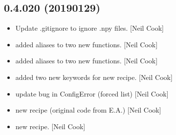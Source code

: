 \documentclass[a4paper,10pt,english]{report}
\begin{document}
\subsection{0.4.020 (2019\sphinxhyphen{}01\sphinxhyphen{}29)}
\label{\detokenize{misc/changelog:id222}}\begin{itemize}
\item {} 
Update .gitignore to ignore .npy files. {[}Neil Cook{]}

\item {} 
 \sphinxhyphen{} added aliases to two new  functions. {[}Neil
Cook{]}

\item {} 
 \sphinxhyphen{} added aliases to two new 
functions. {[}Neil Cook{]}

\item {} 
 \sphinxhyphen{} added two new keywords for new  recipe.
{[}Neil Cook{]}

\item {} 
 \sphinxhyphen{} update bug in ConfigError (forced list) {[}Neil Cook{]}

\item {} 
 \sphinxhyphen{} new  recipe (original code from E.A.) {[}Neil
Cook{]}

\item {} 
 \sphinxhyphen{} new  recipe. {[}Neil Cook{]}

\end{itemize}
\end{document}
